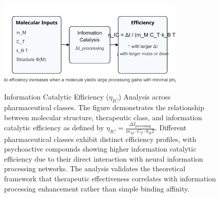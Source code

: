 \begin{figure}[htbp]
\centering
\includegraphics[width=0.8\textwidth]{images/info_catalysis_eta.pdf}
\caption{Information Catalytic Efficiency ($\eta_{IC}$) Analysis across pharmaceutical classes. The figure demonstrates the relationship between molecular structure, therapeutic class, and information catalytic efficiency as defined by $\eta_{IC} = \frac{\Delta I_{\text{processing}}}{m_M \cdot C_T \cdot k_B T}$. Different pharmaceutical classes exhibit distinct efficiency profiles, with psychoactive compounds showing higher information catalytic efficiency due to their direct interaction with neural information processing networks. The analysis validates the theoretical framework that therapeutic effectiveness correlates with information processing enhancement rather than simple binding affinity.}
\label{fig:info_catalysis_eta}
\end{figure}


